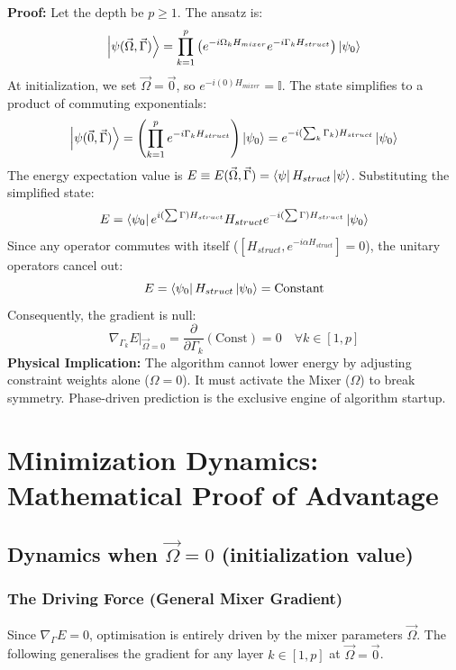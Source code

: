 \documentclass[12pt, a4paper, oneside]{report}
\begin{document}
\textbf{Proof:}
Let the depth be $p \geq 1$. The ansatz is:
\begin{equation}
    \ket{\psi(\vec{\Omega}, \vec{\Gamma})} = \prod_{k=1}^p \left( e^{-i\Omega_k H_{mixer}} e^{-i\Gamma_k H_{struct}} \right) \ket{\psi_0}
\end{equation}
At initialization, we set $\vec{\Omega} = \vec{0}$, so $e^{-i(0) H_{mixer}} = \mathbb{I}$. The state simplifies to a product of commuting exponentials:
\begin{equation}
    \ket{\psi(\vec{0}, \vec{\Gamma})} = \left( \prod_{k=1}^p e^{-i\Gamma_k H_{struct}} \right) \ket{\psi_0} = e^{-i (\sum_k \Gamma_k) H_{struct}} \ket{\psi_0}
\end{equation}
The energy expectation value is $E\equiv E(\vec{\Omega},\vec{\Gamma}) = \bra{\psi} H_{struct} \ket{\psi}$. Substituting the simplified state:
\begin{equation}
    E = \bra{\psi_0} e^{i (\sum \Gamma) H_{struct}} H_{struct} e^{-i (\sum \Gamma) H_{struct}} \ket{\psi_0}
\end{equation}
Since any operator commutes with itself ($[H_{struct}, e^{-i \alpha H_{struct}}] = 0$), the unitary operators cancel out:
\begin{equation}
    E = \bra{\psi_0} H_{struct} \ket{\psi_0} = \text{Constant}
\end{equation}
Consequently, the gradient is null:
\begin{equation}
    \nabla_{\Gamma_k} E \Big|_{\vec{\Omega}=0} = \frac{\partial}{\partial \Gamma_k} (\text{Const}) = 0 \quad \forall k \in [1, p]
\end{equation}
\textbf{Physical Implication:} The algorithm cannot lower energy by adjusting constraint weights alone ($\Omega = 0$). It must activate the Mixer ($\Omega$) to break symmetry. Phase-driven prediction is the exclusive engine of algorithm startup.

\section{Minimization Dynamics: Mathematical Proof of Advantage}
\label{sec:minimization-dynamics}
\subsection{Dynamics when $\vec{\Omega}= 0$ (initialization value)}
\subsubsection{The Driving Force (General Mixer Gradient)}
Since $\nabla_\Gamma E = 0$, optimisation is entirely driven by the mixer parameters $\vec{\Omega}$. The following generalises the gradient for any layer $k \in [1, p]$ at $\vec{\Omega} = \vec{0}$.
\end{document}
